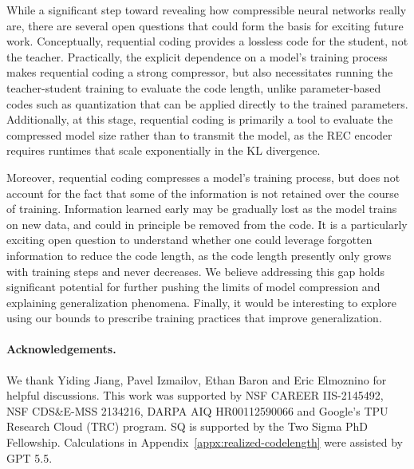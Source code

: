 \documentclass{article}
\theoremstyle{plain}
\theoremstyle{definition}
\theoremstyle{remark}
\begin{document}
While a significant step toward revealing how compressible neural networks really are, there are
several open questions that could form the basis for exciting future work. Conceptually, requential coding provides a lossless code for the student, not the teacher. Practically, the explicit dependence on a model's training process makes requential coding a strong compressor, but also necessitates running the teacher-student training to evaluate the code length, unlike parameter-based codes such as quantization that can be applied directly to the trained parameters. Additionally, at this stage, requential coding is primarily a tool to evaluate the compressed model size rather than to transmit the model, as the REC encoder requires runtimes that scale exponentially in the KL divergence.

%
Moreover, requential coding compresses a model's training process, but does not account for the fact that some of the information is not retained over the course of training. Information learned early may be gradually lost as the model trains on new data, and could in principle be removed from the code. It is a particularly exciting open question to understand whether one could leverage forgotten information to reduce the code length, as the code length presently only grows with training steps and never decreases. We believe addressing this gap holds significant potential for further pushing the limits of model compression and explaining generalization phenomena. Finally, it would be interesting to explore using our bounds to prescribe training practices that improve generalization.

%

%

%


\paragraph{Acknowledgements.}
We thank Yiding Jiang, Pavel Izmailov, Ethan Baron and Eric Elmoznino for helpful discussions. This work was supported by NSF CAREER IIS-2145492, NSF CDS\&E-MSS 2134216, DARPA AIQ
HR00112590066 and Google's TPU Research Cloud (TRC) program. SQ is supported by the Two Sigma PhD Fellowship. Calculations in Appendix~\ref{appx:realized-codelength} were assisted by GPT 5.5.

%

%





%
%
%
%
%
\newpage
\appendix
\end{document}
